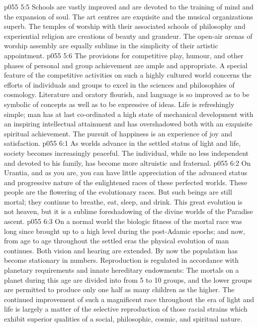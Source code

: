 \vs p055 5:5 Schools are vastly improved and are devoted to the training of mind and the expansion of soul. The art centres are exquisite and the musical organizations superb. The temples of worship with their associated schools of philosophy and experiential religion are creations of beauty and grandeur. The open\hyp{}air arenas of worship assembly are equally sublime in the simplicity of their artistic appointment.
\vs p055 5:6 The provisions for competitive play, humour, and other phases of personal and group achievement are ample and appropriate. A special feature of the competitive activities on such a highly cultured world concerns the efforts of individuals and groups to excel in the sciences and philosophies of cosmology. Literature and oratory flourish, and language is so improved as to be symbolic of concepts as well as to be expressive of ideas. Life is refreshingly simple; man has at last co\hyp{}ordinated a high state of mechanical development with an inspiring intellectual attainment and has overshadowed both with an exquisite spiritual achievement. The pursuit of happiness is an experience of joy and satisfaction.
\vs p055 6:1 As worlds advance in the settled status of light and life, society becomes increasingly peaceful. The individual, while no less independent and devoted to his family, has become more altruistic and fraternal.
\vs p055 6:2 On Urantia, and as you are, you can have little appreciation of the advanced status and progressive nature of the enlightened races of these perfected worlds. These people are the flowering of the evolutionary races. But such beings are still mortal; they continue to breathe, eat, sleep, and drink. This great evolution is not heaven, but it is a sublime foreshadowing of the divine worlds of the Paradise ascent.
\vs p055 6:3 On a normal world the biologic fitness of the mortal race was long since brought up to a high level during the post\hyp{}Adamic epochs; and now, from age to age throughout the settled eras the physical evolution of man continues. Both vision and hearing are extended. By now the population has become stationary in numbers. Reproduction is regulated in accordance with planetary requirements and innate hereditary endowments: The mortals on a planet during this age are divided into from 5 to 10 groups, and the lower groups are permitted to produce only one half as many children as the higher. The continued improvement of such a magnificent race throughout the era of light and life is largely a matter of the selective reproduction of those racial strains which exhibit superior qualities of a social, philosophic, cosmic, and spiritual nature.
